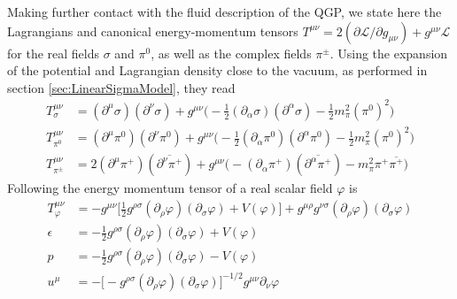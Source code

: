 Making further contact with the fluid description of the QGP, we state here the Lagrangians and canonical energy-momentum tensors ${T^{\mu\nu}=2(\partial\mathscr{L}/\partial g_{\mu\nu})+g^{\mu\nu}\mathscr{L}}$ \cite{Weinberg_2008} for the real fields $\sigma$ and $\pi^0$, as well as the complex fields $\pi^\pm$. Using the expansion of the potential and Lagrangian density close to the vacuum, as performed in section \ref{sec:LinearSigmaModel}, they read
\begin{subequations}
    \begin{align}
        T^{\mu\nu}_{\sigma}&=(\partial^\mu\sigma)(\partial^\nu\sigma)+g^{\mu\nu}\big(-\frac{1}{2}(\partial_\alpha\sigma)(\partial^\alpha\sigma)-\frac{1}{2}m_\pi^2(\pi^0)^2\big)\\
        T^{\mu\nu}_{\pi^0}&=(\partial^\mu\pi^0)(\partial^\nu\pi^0)+g^{\mu\nu}\big(-\frac{1}{2}(\partial_\alpha\pi^0)(\partial^\alpha\pi^0)-\frac{1}{2}m_\pi^2(\pi^0)^2\big)\\
        T^{\mu\nu}_{\pi^\pm}&=2(\partial^\mu\pi^+)(\overline{\partial^\nu\pi^+})+g^{\mu\nu}\big(-(\partial_\alpha\pi^+)(\overline{\partial^\alpha\pi^+})-m_\pi^2\pi^+\overline{\pi^+}\big)
    \end{align}
\end{subequations}
Following \cite{Weinberg_2008} the energy momentum tensor of a real scalar field $\varphi$ is
\begin{subequations}
    \begin{align}
        T_\varphi^{\mu\nu}&=-g^{\mu\nu}\big[\frac{1}{2}g^{\rho\sigma}(\partial_\rho\varphi)(\partial_\sigma\varphi)+V(\varphi)\big]+g^{\mu\rho}g^{\nu\sigma}(\partial_\rho\varphi)(\partial_\sigma\varphi)\\
        \epsilon&=-\frac{1}{2}g^{\rho\sigma}(\partial_\rho\varphi)(\partial_\sigma\varphi)+V(\varphi)\\
        p&=-\frac{1}{2}g^{\rho\sigma}(\partial_\rho\varphi)(\partial_\sigma\varphi)-V(\varphi)\\
        u^\mu&=-\big[-g^{\rho\sigma}(\partial_\rho\varphi)(\partial_\sigma\varphi)\big]^{-1/2}g^{\mu\nu}\partial_\nu\varphi
    \end{align}
\end{subequations}

